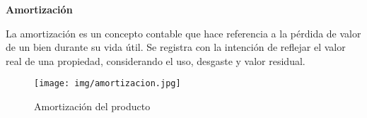 \textbf{Amortización}

La amortización es un concepto contable que hace referencia a la pérdida de valor de un bien durante su vida útil. Se registra con la intención de reflejar el valor real de una propiedad, considerando el uso, desgaste y valor residual. 

\begin{figure}[H]
    \centering	
    \texttt{[image: img/amortizacion.jpg]} 
    \caption{ Amortización del producto}
	\label{fig:amortizacion}
\end{figure}

